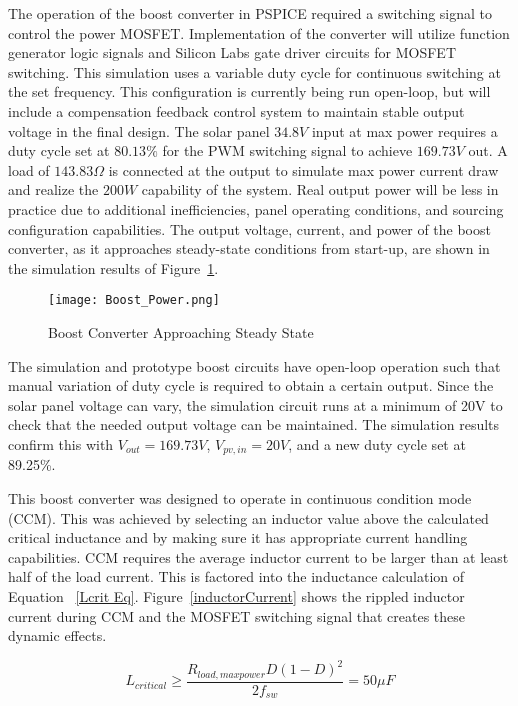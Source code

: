 The operation of the boost converter in PSPICE required a switching signal to control the power MOSFET. Implementation of the converter will utilize function generator logic signals and Silicon Labs gate driver circuits for MOSFET switching. This simulation uses a variable duty cycle for continuous switching at the set frequency. This configuration is currently being run open-loop, but will include a compensation feedback control system to maintain stable output voltage in the final design. The solar panel $34.8V$ input at max power requires a duty cycle set at $80.13\%$ for the PWM switching signal to achieve $169.73V$ out. A load of $143.83\Omega$ is connected at the output to simulate max power current draw and realize the $200W$ capability of the system. Real output power will be less in practice due to additional inefficiencies, panel operating conditions, and sourcing configuration capabilities. The output voltage, current, and power of the boost converter, as it approaches steady-state conditions from start-up, are shown in the simulation results of Figure~\ref{boostApproachSteady}. 

\begin{figure}
\centering
\texttt{[image: Boost\_Power.png]}
\caption{Boost Converter Approaching Steady State}
\label{boostApproachSteady}
\end{figure}

The simulation and prototype boost circuits have open-loop operation such that manual variation of duty cycle is required to obtain a certain output. Since the solar panel voltage can vary, the simulation circuit runs at a minimum of 20V to check that the needed output voltage can be maintained. The simulation results confirm this with $V_{out}=169.73V$, $V_{pv,in}=20V$, and a new duty cycle set at 89.25\%. 

This boost converter was designed to operate in continuous condition mode (CCM). This was achieved by selecting an inductor value above the calculated critical inductance and by making sure it has appropriate current handling capabilities. CCM requires the average inductor current to be larger than at least half of the load current. This is factored into the inductance calculation of Equation ~\ref{Lcrit Eq}.  Figure~\ref{inductorCurrent} shows the rippled inductor current during CCM and the MOSFET switching signal that creates these dynamic effects. 

\begin{equation}
 L_{critical} \ge \frac{R_{load,maxpower}D(1-D)^2}{2f_{sw}}= 50 \mu F
\label{Lcrit Eq}
\end{equation}

